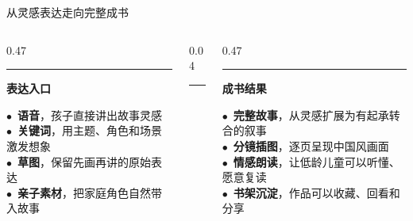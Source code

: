 \documentclass{beamer}
\newcommand{\sidehead}[2][buptred]{%
  {\color{#1}\rule[-0.15em]{2.5pt}{1.0em}}\hspace{0.45em}\textbf{\small\color{darkred}#2}\par
  \vspace{2pt}%
}
\newcommand{\redot}{\textcolor{buptred}{\scriptsize$\bullet$}~}
\begin{document}
\begin{frame}[t]{从灵感表达走向完整成书}
  \vspace{0.28cm}
  \begin{columns}[T, onlytextwidth]
      \begin{column}[T]{0.47\linewidth}
          \sidehead{表达入口}
          \scriptsize
          \redot \textbf{语音}，孩子直接讲出故事灵感\\[2pt]
          \redot \textbf{关键词}，用主题、角色和场景激发想象\\[2pt]
          \redot \textbf{草图}，保留先画再讲的原始表达\\[2pt]
          \redot \textbf{亲子素材}，把家庭角色自然带入故事
      \end{column}
      \begin{column}[T]{0.04\linewidth}
          \centering\textcolor{accentgold!60}{\rule{0.4pt}{5.4em}}
      \end{column}
      \begin{column}[T]{0.47\linewidth}
          \sidehead[accentgold]{成书结果}
          \scriptsize
          \redot \textbf{完整故事}，从灵感扩展为有起承转合的叙事\\[2pt]
          \redot \textbf{分镜插图}，逐页呈现中国风画面\\[2pt]
          \redot \textbf{情感朗读}，让低龄儿童可以听懂、愿意复读\\[2pt]
          \redot \textbf{书架沉淀}，作品可以收藏、回看和分享
      \end{column}
  \end{columns}
\end{frame}
\end{document}
